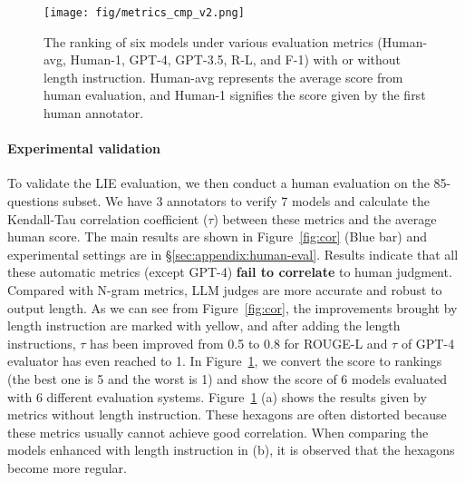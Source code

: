\begin{figure}[t]
\vspace{-1em}
    \centering
    \texttt{[image: fig/metrics\_cmp\_v2.png]}
    \vspace{-0.5em}
    \caption{The ranking of six models under various evaluation metrics (Human-avg, Human-1, GPT-4, GPT-3.5, R-L, and F-1) with or without length instruction. {Human-avg} represents the average score from human evaluation, and {Human-1} signifies the score given by the first human annotator.}
    \label{fig:radar}
\end{figure}

\vspace{-0.7em}
\paragraph{Experimental validation} To validate the LIE evaluation, we then conduct a human evaluation on the 85-questions subset. We have 3 annotators to verify 7 models and calculate the Kendall-Tau correlation coefficient ($\tau$) between these metrics and the average human score. The main results are shown in Figure~\ref{fig:cor} (Blue bar) and experimental settings are in \S\ref{sec:appendix:human-eval}. Results indicate that all these automatic metrics (except GPT-4) \textbf{fail to correlate} to human judgment. Compared with N-gram metrics, LLM judges are more accurate and robust to output length.
As we can see from Figure~\ref{fig:cor}, the improvements brought by length instruction are marked with yellow, and after adding the length instructions, $\tau$ has been improved from 0.5 to 0.8 for ROUGE-L and $\tau$ of GPT-4 evaluator has even reached to 1. In Figure~\ref{fig:radar}, we convert the score to rankings (the best one is 5 and the worst is 1) and show the score of 6 models evaluated with 6 different evaluation systems. Figure~\ref{fig:radar} (a) shows the results given by metrics without length instruction. These hexagons are often distorted because these metrics usually cannot achieve good correlation. When comparing the models enhanced with length instruction in (b), it is observed that the hexagons become more regular.

